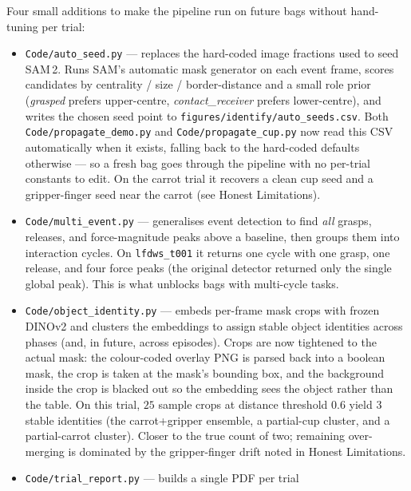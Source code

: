 \documentclass[11pt]{article}
\begin{document}
Four small additions to make the pipeline run on future bags without
hand-tuning per trial:

\begin{itemize}[noitemsep]
  \item \texttt{Code/auto\_seed.py} --- replaces the hard-coded image
        fractions used to seed SAM\,2. Runs SAM's automatic mask generator
        on each event frame, scores candidates by centrality / size /
        border-distance and a small role prior (\textit{grasped} prefers
        upper-centre, \textit{contact\_receiver} prefers lower-centre),
        and writes the chosen seed point to
        \texttt{figures/identify/auto\_seeds.csv}. Both
        \texttt{Code/propagate\_demo.py} and \texttt{Code/propagate\_cup.py}
        now read this CSV automatically when it exists, falling back to the
        hard-coded defaults otherwise --- so a fresh bag goes through the
        pipeline with no per-trial constants to edit. On the carrot trial
        it recovers a clean cup seed and a gripper-finger seed near the
        carrot (see Honest Limitations).
  \item \texttt{Code/multi\_event.py} --- generalises event detection to
        find \emph{all} grasps, releases, and force-magnitude peaks above a
        baseline, then groups them into interaction cycles. On
        \texttt{lfdws\_t001} it returns one cycle with one grasp,
        one release, and four force peaks (the original detector returned
        only the single global peak). This is what unblocks bags with
        multi-cycle tasks.
  \item \texttt{Code/object\_identity.py} --- embeds per-frame mask crops
        with frozen DINOv2 and clusters the embeddings to assign stable
        object identities across phases (and, in future, across episodes).
        Crops are now tightened to the actual mask: the colour-coded
        overlay PNG is parsed back into a boolean mask, the crop is taken
        at the mask's bounding box, and the background inside the crop is
        blacked out so the embedding sees the object rather than the table.
        On this trial, $25$ sample crops at distance threshold $0.6$ yield
        $3$ stable identities (the carrot+gripper ensemble, a partial-cup
        cluster, and a partial-carrot cluster). Closer to the true count
        of two; remaining over-merging is dominated by the gripper-finger
        drift noted in Honest Limitations.
  \item \texttt{Code/trial\_report.py} --- builds a single PDF per trial

\end{itemize}
\end{document}
